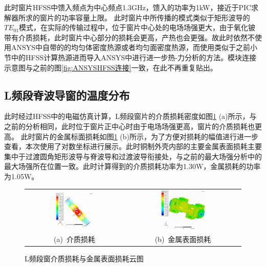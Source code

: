 \documentclass[master]{thesis-uestc}
\begin{document}
此时窗片HFSS中馈入频点为中心频点1.3GHz，馈入的功率为1kW，接近于PIC求解器所求的窗片的功率容量上限。
此时窗片中所传播的模式类似于矩形波导的\(TE_{01}\)模式，在实际的传输过程中，位于窗片中心处的电场场强更大，由于氧化铍带有介质损耗，此时窗片中心部分的损耗会更高，产热也会更强。故此时依然不使用ANSYS中自带的的均匀体密度热源或者均匀面密度热源，而使用类似于之前小节中的HFSS计算热源进而导入ANSYS中进行进一步热-力分析的方法。模块连接示意图与之前的图\ref{fig:ANSYSHFSS连接}一致，在此不再重复贴出。

\subsection{L频段脊波导窗的温度分布}
此时经过HFSS中的电磁仿真计算，L频段窗片的介质损耗密度如图\ref{fig:L体损耗与面损耗} (a)所示，与之前的分析相同，此时位于窗片正中心时由于电场场强更高，窗片的介质损耗也更高。
此时窗片的金属标面损耗如图\ref{fig:L体损耗与面损耗} (b)所示，为了方便对损耗的幅值进行进一步查看，本次使用了对数坐标进行展示。此时铜制外壳内部的主要金属表面损耗主要集中于过渡圆角矩形波导与脊波导和过渡波导衔接处，与之前的最大场强分析中的最大场强所在位置一致。此时计算得到的介质损耗功率为1.30W，金属损耗的功率为1.05W。
\begin{figure}[!htb]
    \small
    \centering
    \begin{tabular}{@{\ }c@{\ }c}
        \includegraphics[width=0.4\textwidth]{pic/chapter4/L窗片介质损耗.png} & 
        \hspace{5pt}
        \includegraphics[width=0.4\textwidth]{pic/chapter4/L金属表面损耗.png}     \\
        \mbox{\small (a) 介质损耗}                                                                               & 
        \mbox{\small (b) 金属表面损耗}                                                                                  \\
    \end{tabular}
    \caption{L频段窗介质损耗与金属表面损耗云图}
    \label{fig:L体损耗与面损耗}
\end{figure}
\end{document}
